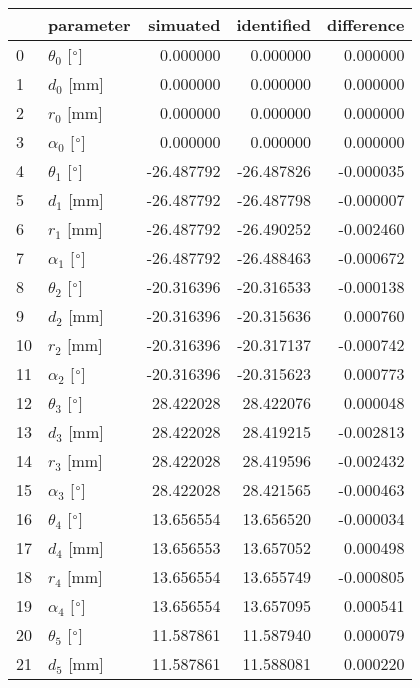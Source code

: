 \documentclass{standalone}%
\begin{document}
%
\normalsize%
\begin{tabular}{llrrr}
\toprule
{} &                 parameter &   simuated & identified & difference \\
\midrule
0  &  $\theta_{0}$ [$\degree$] &   0.000000 &   0.000000 &   0.000000 \\
1  &              $d_{0}$ [mm] &   0.000000 &   0.000000 &   0.000000 \\
2  &              $r_{0}$ [mm] &   0.000000 &   0.000000 &   0.000000 \\
3  &  $\alpha_{0}$ [$\degree$] &   0.000000 &   0.000000 &   0.000000 \\
4  &  $\theta_{1}$ [$\degree$] & -26.487792 & -26.487826 &  -0.000035 \\
5  &              $d_{1}$ [mm] & -26.487792 & -26.487798 &  -0.000007 \\
6  &              $r_{1}$ [mm] & -26.487792 & -26.490252 &  -0.002460 \\
7  &  $\alpha_{1}$ [$\degree$] & -26.487792 & -26.488463 &  -0.000672 \\
8  &  $\theta_{2}$ [$\degree$] & -20.316396 & -20.316533 &  -0.000138 \\
9  &              $d_{2}$ [mm] & -20.316396 & -20.315636 &   0.000760 \\
10 &              $r_{2}$ [mm] & -20.316396 & -20.317137 &  -0.000742 \\
11 &  $\alpha_{2}$ [$\degree$] & -20.316396 & -20.315623 &   0.000773 \\
12 &  $\theta_{3}$ [$\degree$] &  28.422028 &  28.422076 &   0.000048 \\
13 &              $d_{3}$ [mm] &  28.422028 &  28.419215 &  -0.002813 \\
14 &              $r_{3}$ [mm] &  28.422028 &  28.419596 &  -0.002432 \\
15 &  $\alpha_{3}$ [$\degree$] &  28.422028 &  28.421565 &  -0.000463 \\
16 &  $\theta_{4}$ [$\degree$] &  13.656554 &  13.656520 &  -0.000034 \\
17 &              $d_{4}$ [mm] &  13.656553 &  13.657052 &   0.000498 \\
18 &              $r_{4}$ [mm] &  13.656554 &  13.655749 &  -0.000805 \\
19 &  $\alpha_{4}$ [$\degree$] &  13.656554 &  13.657095 &   0.000541 \\
20 &  $\theta_{5}$ [$\degree$] &  11.587861 &  11.587940 &   0.000079 \\
21 &              $d_{5}$ [mm] &  11.587861 &  11.588081 &   0.000220 \\

\end{tabular}
\end{document}
